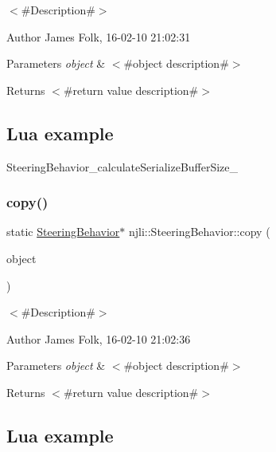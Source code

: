 $<$\#\+Description\#$>$ 

\begin{DoxyAuthor}{Author}
James Folk, 16-\/02-\/10 21\+:02\+:31
\end{DoxyAuthor}

\begin{DoxyParams}{Parameters}
{\em object} & $<$\#object description\#$>$\\
\hline
\end{DoxyParams}
\begin{DoxyReturn}{Returns}
$<$\#return value description\#$>$
\end{DoxyReturn}
\hypertarget{classnjli_1_1_steering_behavior_wander_ex1}{}\subsection{Lua example}\label{classnjli_1_1_steering_behavior_wander_ex1}

\begin{DoxyCodeInclude}
\end{DoxyCodeInclude}
Steering\+Behavior\+\_\+calculate\+Serialize\+Buffer\+Size\+\_\+ \mbox{\label{classnjli_1_1_steering_behavior_a7a24f6e560057d1609da98ac353561b6}} 
\subsubsection{\texorpdfstring{copy()}{copy()}}
{\footnotesize\ttfamily static \mbox{\hyperlink{classnjli_1_1_steering_behavior}{Steering\+Behavior}}$\ast$ njli\+::\+Steering\+Behavior\+::copy (\begin{DoxyParamCaption}\item[{const \mbox{\hyperlink{classnjli_1_1_steering_behavior}{Steering\+Behavior}} \&}]{object }\end{DoxyParamCaption})\hspace{0.3cm}{\ttfamily [static]}}



$<$\#\+Description\#$>$ 

\begin{DoxyAuthor}{Author}
James Folk, 16-\/02-\/10 21\+:02\+:36
\end{DoxyAuthor}

\begin{DoxyParams}{Parameters}
{\em object} & $<$\#object description\#$>$\\
\hline
\end{DoxyParams}
\begin{DoxyReturn}{Returns}
$<$\#return value description\#$>$
\end{DoxyReturn}
\hypertarget{classnjli_1_1_steering_behavior_wander_ex1}{}\subsection{Lua example}\label{classnjli_1_1_steering_behavior_wander_ex1}


